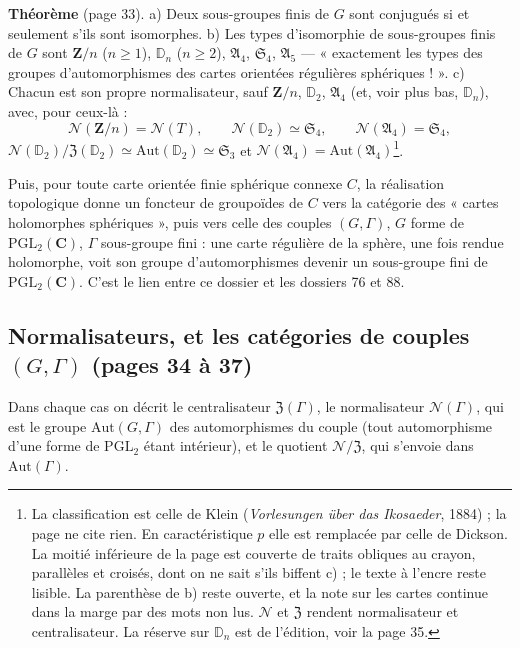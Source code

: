 \documentclass[11pt,a4paper]{article}
\begin{document}
\textbf{Théorème} (page 33). a) Deux sous-groupes finis de $G$ sont conjugués
si et seulement s'ils sont isomorphes. b) Les types d'isomorphie de
sous-groupes finis de $G$ sont $\mathbf{Z}/n$ ($n \geq 1$), $\mathbb{D}_n$
($n \geq 2$), $\mathfrak{A}_4$, $\mathfrak{S}_4$, $\mathfrak{A}_5$ ---
« exactement les types des groupes d'automorphismes des cartes orientées
régulières sphériques ! ». c) Chacun est son propre normalisateur, sauf
$\mathbf{Z}/n$, $\mathbb{D}_2$, $\mathfrak{A}_4$ (et, voir plus bas,
$\mathbb{D}_n$), avec, pour ceux-là :
\[
  \mathcal{N}(\mathbf{Z}/n) = \mathcal{N}(T), \qquad
  \mathcal{N}(\mathbb{D}_2) \simeq \mathfrak{S}_4, \qquad
  \mathcal{N}(\mathfrak{A}_4) = \mathfrak{S}_4 ,
\]
$\mathcal{N}(\mathbb{D}_2)/\mathfrak{Z}(\mathbb{D}_2) \simeq
\mathrm{Aut}(\mathbb{D}_2) \simeq \mathfrak{S}_3$ et $\mathcal{N}(\mathfrak{A}_4)
= \mathrm{Aut}(\mathfrak{A}_4)$\footnote{La classification est celle de Klein
(\emph{Vorlesungen über das Ikosaeder}, 1884) ; la page ne cite rien. En
caractéristique $p$ elle est remplacée par celle de Dickson. La moitié
inférieure de la page est couverte de traits obliques au crayon, parallèles
et croisés, dont on ne sait s'ils biffent c) ; le texte à l'encre reste
lisible. La parenthèse de b) reste ouverte, et la note sur les cartes
continue dans la marge par des mots non lus. $\mathcal{N}$ et $\mathfrak{Z}$
rendent normalisateur et centralisateur. La réserve sur $\mathbb{D}_n$ est
de l'édition, voir la page 35.}.

Puis, pour toute carte orientée finie sphérique connexe $C$, la réalisation
topologique donne un foncteur de groupoïdes de $C$ vers la catégorie des
« cartes holomorphes sphériques », puis vers celle des couples $(G, \Gamma)$,
$G$ forme de $\mathrm{PGL}_2(\mathbf{C})$, $\Gamma$ sous-groupe fini : une carte
régulière de la sphère, une fois rendue holomorphe, voit son groupe
d'automorphismes devenir un sous-groupe fini de $\mathrm{PGL}_2(\mathbf{C})$.
C'est le lien entre ce dossier et les dossiers 76 et 88.

\subsection*{Normalisateurs, et les catégories de couples $(G, \Gamma)$ (pages 34 à 37)}

Dans chaque cas on décrit le centralisateur $\mathfrak{Z}(\Gamma)$, le
normalisateur $\mathcal{N}(\Gamma)$, qui est le groupe
$\mathrm{Aut}(G, \Gamma)$ des automorphismes du couple (tout automorphisme
d'une forme de $\mathrm{PGL}_2$ étant intérieur), et le quotient
$\mathcal{N}/\mathfrak{Z}$, qui s'envoie dans $\mathrm{Aut}(\Gamma)$.
\end{document}

